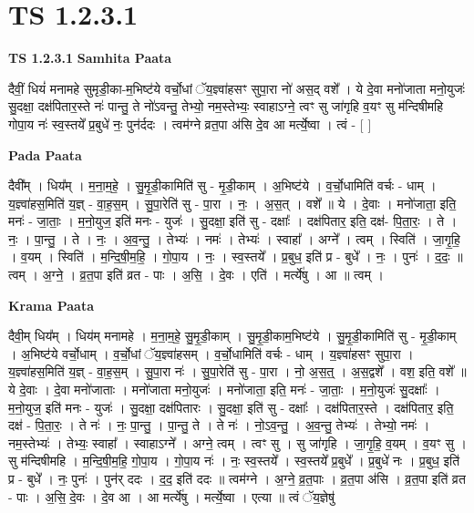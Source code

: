 \documentclass[17pt]{extarticle}
\begin{document}
\section{ TS 1.2.3.1 }

\textbf{TS 1.2.3.1 } \newline
\textbf{Samhita Paata} \newline

दैवीं॒ धियं॑ मनामहे सुमृडी॒का-म॒भिष्ट॑ये वर्चो॒धां ॅय॒ज्ञ्वा॑हसꣳ सुपा॒रा नो॑ अस॒द् वशे᳚ । ये दे॒वा मनो॑जाता मनो॒युजः॑ सु॒दक्षा॒ दक्ष॑पितार॒स्ते नः॑ पान्तु॒ ते नो॑ऽवन्तु॒ तेभ्यो॒ नम॒स्तेभ्यः॒ स्वाहाऽग्ने॒ त्वꣳ सु जा॑गृहि व॒यꣳ सु म॑न्दिषीमहि गोपा॒य नः॑ स्व॒स्तये᳚ प्र॒बुधे॑ नः॒ पुन॑र्ददः । त्वम॑ग्ने व्रत॒पा अ॑सि दे॒व आ मर्त्ये॒ष्वा । त्वं - [ ] \newline

\textbf{Pada Paata} \newline

दैवी᳚म् । धिय᳚म् । म॒ना॒म॒हे॒ । सु॒मृ॒डी॒कामिति॑ सु - मृ॒डी॒काम् । अ॒भिष्ट॑ये । व॒र्चो॒धामिति॑ वर्चः - धाम् । य॒ज्ञ्वा॑हस॒मिति॑ य॒ज्ञ् - वा॒ह॒स॒म् । सु॒पा॒रेति॑ सु - पा॒रा । नः॒ । अ॒स॒त् । वशे᳚ ॥ ये । दे॒वाः । मनो॑जाता॒ इति॒ मनः॑ - जा॒ताः॒ । म॒नो॒युज॒ इति॑ मनः - युजः॑ । सु॒दक्षा॒ इति॑ सु - दक्षाः᳚ । दक्ष॑पितार॒ इति॒ दक्ष॑- पि॒ता॒रः॒ । ते । नः॒ । पा॒न्तु॒ । ते । नः॒ । अ॒व॒न्तु॒ । तेभ्यः॑ । नमः॑ । तेभ्यः॑ । स्वाहा᳚ । अग्ने᳚ । त्वम् । स्विति॑ । जा॒गृ॒हि॒ । व॒यम् । स्विति॑ । म॒न्दि॒षी॒म॒हि॒ । गो॒पा॒य । नः॒ । स्व॒स्तये᳚ । प्र॒बुध॒ इति॑ प्र - बुधे᳚ । नः॒ । पुनः॑ । द॒दः॒ ॥ त्वम् । अ॒ग्ने॒ । व्र॒त॒पा इति॑ व्रत - पाः । अ॒सि॒ । दे॒वः । एति॑ । मर्त्ये॑षु । आ ॥ त्वम् ।  \newline


\textbf{Krama Paata} \newline

दैवी॒म् धिय᳚म् । धिय॑म् मनामहे । म॒ना॒म॒हे॒ सु॒मृ॒डी॒काम् । सु॒मृ॒डी॒काम॒भिष्ट॑ये । सु॒मृ॒डी॒कामिति॑ सु - मृ॒डी॒काम् । अ॒भिष्ट॑ये वर्चो॒धाम् । व॒र्चो॒धां ॅय॒ज्ञ्वा॑हसम् । व॒र्चो॒धामिति॑ वर्चः - धाम् । य॒ज्ञ्वा॑हसꣳ सुपा॒रा । य॒ज्ञ्वा॑हस॒मिति॑ य॒ज्ञ् - वा॒ह॒स॒म् । सु॒पा॒रा नः॑ । सु॒पा॒रेति॑ सु - पा॒रा । नो॒ अ॒स॒त्॒ । अ॒स॒द्वशे᳚ । वश॒ इति॒ वशे᳚ ॥ ये दे॒वाः । दे॒वा मनो॑जाताः । मनो॑जाता मनो॒युजः॑ । मनो॑जाता॒ इति॒ मनः॑ - जा॒ताः॒ । म॒नो॒युजः॑ सु॒दक्षाः᳚ । म॒नो॒युज॒ इति॑ मनः - युजः॑ । सु॒दक्षा॒ दक्ष॑पितारः । सु॒दक्षा॒ इति॑ सु - दक्षाः᳚ । दक्ष॑पितार॒स्ते । दक्ष॑पितार॒ इति॒ दक्ष॑ - पि॒ता॒रः॒ । ते नः॑ । नः॒ पा॒न्तु॒ । पा॒न्तु॒ ते । ते नः॑ । नो॒ऽव॒न्तु॒ । अ॒व॒न्तु॒ तेभ्यः॑ । तेभ्यो॒ नमः॑ । नम॒स्तेभ्यः॑ । तेभ्यः॒ स्वाहा᳚ । स्वाहाऽग्ने᳚ । अग्ने॒ त्वम् । त्वꣳ सु । सु जा॑गृहि । जा॒गृ॒हि॒ व॒यम् । व॒यꣳ सु । सु म॑न्दिषीमहि । म॒न्दि॒षी॒म॒हि॒ गो॒पा॒य । गो॒पा॒य नः॑ । नः॒ स्व॒स्तये᳚ । स्व॒स्तये᳚ प्र॒बुधे᳚ । प्र॒बुधे॑ नः । प्र॒बुध॒ इति॑ प्र - बुधे᳚ । नः॒ पुनः॑ । पुन॑र् ददः । द॒द॒ इति॑ ददः ॥ त्वम॑ग्ने । अ॒ग्ने॒ व्र॒त॒पाः । व्र॒त॒पा अ॑सि । व्र॒त॒पा इति॑ व्रत - पाः । अ॒सि॒ दे॒वः । दे॒व आ । आ मर्त्ये॑षु । मर्त्ये॒ष्वा । एत्या ॥ त्वं ॅय॒ज्ञेषु॑ \newline
\end{document}
